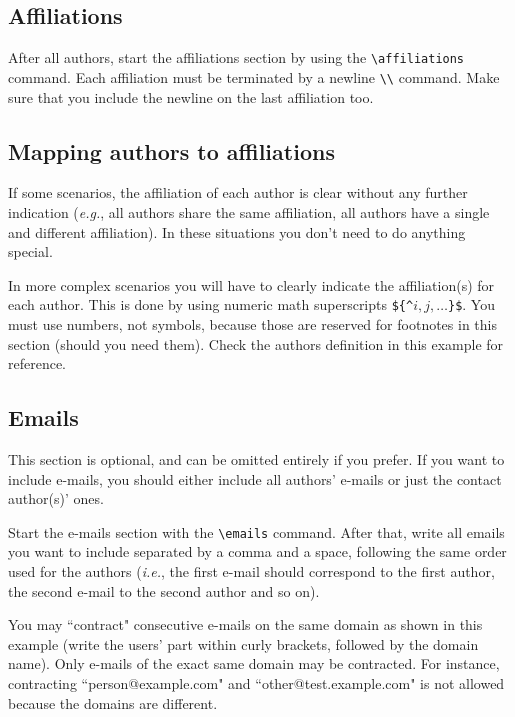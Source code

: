 \documentclass{article}
\begin{document}
\subsection{Affiliations}

After all authors, start the affiliations section by using the {\tt \textbackslash{}affiliations} command.
Each affiliation must be terminated by a newline {\tt \textbackslash{}\textbackslash{}} command. Make sure that you include the newline on the last affiliation too.

\subsection{Mapping authors to affiliations}

If some scenarios, the affiliation of each author is clear without any further indication (\emph{e.g.}, all authors share the same affiliation, all authors have a single and different affiliation). In these situations you don't need to do anything special.

In more complex scenarios you will have to clearly indicate the affiliation(s) for each author. This is done by using numeric math superscripts {\tt \$\{\^{}$i,j, \ldots$\}\$}. You must use numbers, not symbols, because those are reserved for footnotes in this section (should you need them). Check the authors definition in this example for reference.

\subsection{Emails}

This section is optional, and can be omitted entirely if you prefer. If you want to include e-mails, you should either include all authors' e-mails or just the contact author(s)' ones.

Start the e-mails section with the {\tt \textbackslash{}emails} command. After that, write all emails you want to include separated by a comma and a space, following the same order used for the authors (\emph{i.e.}, the first e-mail should correspond to the first author, the second e-mail to the second author and so on).

You may ``contract" consecutive e-mails on the same domain as shown in this example (write the users' part within curly brackets, followed by the domain name). Only e-mails of the exact same domain may be contracted. For instance, contracting ``person@example.com" and ``other@test.example.com" is not allowed because the domains are different.



\end{document}
